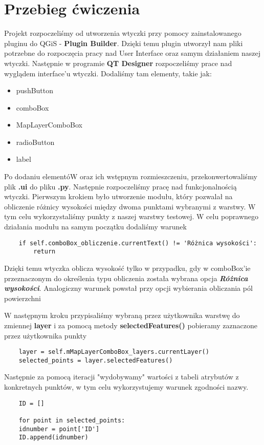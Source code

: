 \documentclass[a4paper,titleauthor]{mwart}
\begin{document}
\section{Przebieg ćwiczenia}
Projekt rozpoczeliśmy od utworzenia wtyczki przy pomocy zainstalowanego pluginu do QGiS - \textbf{Plugin Builder}. Dzięki temu plugin utworzył nam pliki potrzebne do rozpoczęcia pracy nad User Interface oraz samym działaniem naszej wtyczki. Następnie w programie \textbf{QT Designer} rozpoczeliśmy prace nad wyglądem interface'u wtyczki. Dodaliśmy tam elementy, takie jak:
\begin{itemize}
	\item pushButton
	\item comboBox
	\item MapLayerComboBox
	\item radioButton
	\item label
\end{itemize}		
Po dodaniu elementóW oraz ich wstępnym rozmieszczeniu, przekonwertowaliśmy plik \textbf{.ui} do pliku \textbf{.py}. Następnie rozpoczeliśmy pracę nad funkcjonalnością wtyczki. Pierwszym krokiem było utworzenie modułu, który pozwalał na obliczenie różnicy wysokości między dwoma punktami wybranymi z warstwy. W tym celu wykorzystaliśmy punkty z naszej warstwy testowej. W celu poprawnego działania modułu na samym początku dodaliśmy warunek 
\begin{verbatim}
	if self.comboBox_obliczenie.currentText() != 'Różnica wysokości':
		return
\end{verbatim}
Dzięki temu wtyczka oblicza wysokość tylko w przypadku, gdy w comboBox'ie przeznaczonym do określenia typu obliczenia została wybrana opcja \textbf{\textit{Różnica wysokości}}.
Analogiczny warunek powstał przy opcji wybierania obliczania pól powierzchni

W następnym kroku przypisaliśmy wybraną przez użytkownika warstwę do zmiennej \textbf{layer} i za pomocą metody \textbf{selectedFeatures()} pobieramy zaznaczone przez użytkownika punkty

\begin{verbatim}
	layer = self.mMapLayerComboBox_layers.currentLayer()
	selected_points = layer.selectedFeatures()
\end{verbatim}
Następnie za pomocą iteracji "wydobywamy" wartości z tabeli atrybutów z konkretnych punktów, w tym celu wykorzystujemy warunek zgodności nazwy.

\begin{verbatim}
	ID = []
	
	for point in selected_points:
	idnumber = point['ID']
	ID.append(idnumber)
\end{verbatim}
\end{document}
